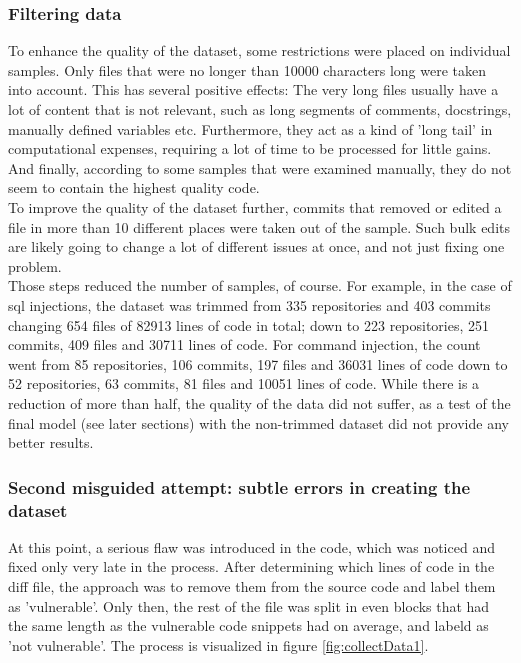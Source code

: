 \documentclass[
a4paper,
pagesize,
pdftex,
12pt,
twoside, %
BCOR=5mm, %
ngerman,
fleqn,
final,
]{scrartcl}
\begin{document}
	\subsubsection{Filtering data}
	To enhance the quality of the dataset, some restrictions were placed on individual samples. Only files that were no longer than 10000 characters long were taken into account. This has several positive effects: The very long files usually have a lot of content that is not relevant, such as long segments of comments, docstrings, manually defined variables etc. Furthermore, they act as a kind of 'long tail' in computational expenses, requiring a lot of time to be processed for little gains. And finally, according to some samples that were examined manually, they do not seem to contain the highest quality code.\\
	To improve the quality of the dataset further, commits that removed or edited a file in more than 10 different places were taken out of the sample. Such bulk edits are likely going to change a lot of different issues at once, and not just fixing one problem.\\
	Those steps reduced the number of samples, of course. For example, in the case of sql injections, the dataset was trimmed from 335 repositories and 403 commits changing 654 files of 82913 lines of code in total; down to 223 repositories, 251 commits, 409 files and 30711 lines of code. For command injection, the count went from 85 repositories, 106 commits, 197 files and 36031 lines of code down to 52 repositories, 63 commits, 81 files and 10051 lines of code. While there is a reduction of more than half, the quality of the data did not suffer, as a test of the final model (see later sections) with the non-trimmed dataset did not provide any better results.
	
	\subsubsection{Second misguided attempt: subtle errors in creating the dataset}
	At this point, a serious flaw was introduced in the code, which was noticed and fixed only very late in the process. After determining which lines of code in the diff file, the approach was to remove them from the source code and label them as 'vulnerable'. Only then, the rest of the file was split in even blocks that had the same length as the vulnerable code snippets had on average, and labeld as 'not vulnerable'. The process is visualized in figure \ref{fig:collectData1}.
	
\end{document}
